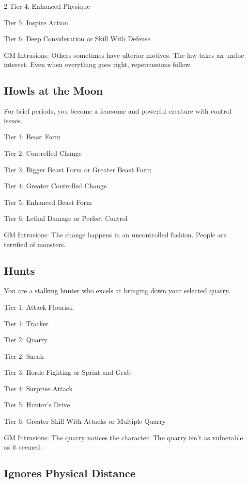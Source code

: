 \begin{multicols}{2}
Tier 4: Enhanced Physique

Tier 5: Inspire Action

Tier 6: Deep Consideration or Skill With Defense

GM Intrusions: Others sometimes have ulterior motives. The law takes an undue interest. Even when everything goes right, repercussions follow.

\subsection{Howls at the Moon}

For brief periods, you become a fearsome and powerful creature with control issues.

Tier 1: Beast Form

Tier 2: Controlled Change

Tier 3: Bigger Beast Form or Greater Beast Form

Tier 4: Greater Controlled Change

Tier 5: Enhanced Beast Form

Tier 6: Lethal Damage or Perfect Control

GM Intrusions: The change happens in an uncontrolled fashion. People are terrified of monsters.

\subsection{Hunts}

You are a stalking hunter who excels at bringing down your selected quarry.

Tier 1: Attack Flourish

Tier 1: Tracker

Tier 2: Quarry

Tier 2: Sneak

Tier 3: Horde Fighting or Sprint and Grab

Tier 4: Surprise Attack

Tier 5: Hunter’s Drive

Tier 6: Greater Skill With Attacks or Multiple Quarry

GM Intrusions: The quarry notices the character. The quarry isn’t as vulnerable as it seemed.

\subsection{Ignores Physical Distance}


\end{multicols}
